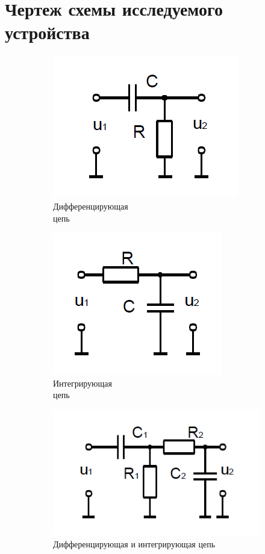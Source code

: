 \documentclass[a4paper,14pt]{extarticle}
\begin{document}
\section{Чертеж схемы исследуемого устройства}

\begin{figure}[H]
\begin{center}
	\begin{subfigure}[b]{0.3\textwidth}
		\includegraphics[scale=0.4]{diff}
		\caption{Дифференцирующая\\ цепь}
	\end{subfigure}
	\begin{subfigure}[b]{0.3\textwidth}
		\includegraphics[scale=0.4]{int}
		\caption{Интегрирующая\\ цепь}
	\end{subfigure}
	\begin{subfigure}[b]{0.3\textwidth}
		\includegraphics[scale=0.4]{diff-int}
		\captionsetup{justification=centering}
		\caption{Дифференцирующая и интегрирующая цепь}
	\end{subfigure}
	\caption{}
\end{center}
\end{figure}
\end{document}
